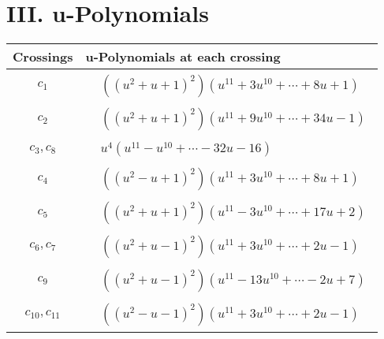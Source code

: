 \documentclass[1p]{elsarticle_modified}
\theoremstyle{definition}
\begin{document}
\newpage\renewcommand{\arraystretch}{1}
\centering \section*{ III. u-Polynomials}
\begin{tabular}{m{50pt}|m{274pt}}
Crossings & \hspace{64pt}u-Polynomials at each crossing \\
\hline $$\begin{aligned}c_{1}\end{aligned}$$&$\begin{aligned}
&((u^2+u+1)^2)(u^{11}+3 u^{10}+\cdots+8 u+1)
\end{aligned}$\\
\hline $$\begin{aligned}c_{2}\end{aligned}$$&$\begin{aligned}
&((u^2+u+1)^2)(u^{11}+9 u^{10}+\cdots+34 u-1)
\end{aligned}$\\
\hline $$\begin{aligned}c_{3},c_{8}\end{aligned}$$&$\begin{aligned}
&u^4(u^{11}- u^{10}+\cdots-32 u-16)
\end{aligned}$\\
\hline $$\begin{aligned}c_{4}\end{aligned}$$&$\begin{aligned}
&((u^2- u+1)^2)(u^{11}+3 u^{10}+\cdots+8 u+1)
\end{aligned}$\\
\hline $$\begin{aligned}c_{5}\end{aligned}$$&$\begin{aligned}
&((u^2+u+1)^2)(u^{11}-3 u^{10}+\cdots+17 u+2)
\end{aligned}$\\
\hline $$\begin{aligned}c_{6},c_{7}\end{aligned}$$&$\begin{aligned}
&((u^2+u-1)^2)(u^{11}+3 u^{10}+\cdots+2 u-1)
\end{aligned}$\\
\hline $$\begin{aligned}c_{9}\end{aligned}$$&$\begin{aligned}
&((u^2+u-1)^2)(u^{11}-13 u^{10}+\cdots-2 u+7)
\end{aligned}$\\
\hline $$\begin{aligned}c_{10},c_{11}\end{aligned}$$&$\begin{aligned}
&((u^2- u-1)^2)(u^{11}+3 u^{10}+\cdots+2 u-1)
\end{aligned}$\\
\hline
\end{tabular}\newpage\renewcommand{\arraystretch}{1}
\end{document}
